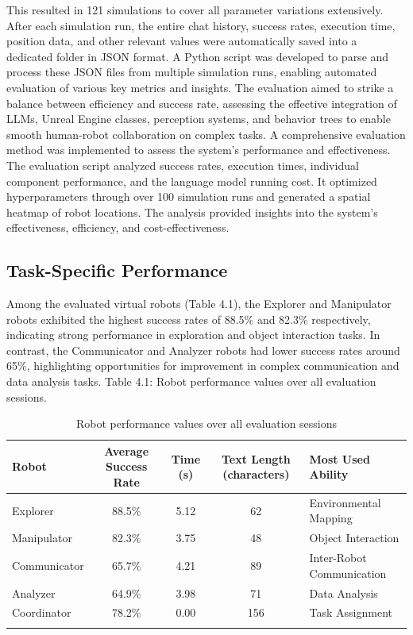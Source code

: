 \documentclass[pdflatex,sn-mathphys-num]{sn-jnl}%
\theoremstyle{thmstyleone}
\theoremstyle{thmstyletwo}%
\theoremstyle{thmstylethree}%
\begin{document}
This resulted in 121 simulations to cover all parameter variations extensively.
After each simulation run, the entire chat history, success rates, execution time, position data, and other relevant values were automatically saved into a dedicated folder in JSON format. A Python script was developed to parse and process these JSON files from multiple simulation runs, enabling automated evaluation of various key metrics and insights.
The evaluation aimed to strike a balance between efficiency and success rate, assessing the effective integration of LLMs, Unreal Engine classes, perception systems, and behavior trees to enable smooth human-robot collaboration on complex tasks. A comprehensive evaluation method was implemented to assess the system's performance and effectiveness.
The evaluation script analyzed success rates, execution times, individual component performance, and the language model running cost. It optimized hyperparameters through over 100 simulation runs and generated a spatial heatmap of robot locations. The analysis provided insights into the system's effectiveness, efficiency, and cost-effectiveness.
\subsection{Task-Specific Performance}
Among the evaluated virtual robots (Table 4.1), the Explorer and Manipulator robots exhibited the highest success rates of 88.5\% and 82.3\% respectively, indicating strong performance in exploration and object interaction tasks. In contrast, the Communicator and Analyzer robots had lower success rates around 65\%, highlighting opportunities for improvement in complex communication and data analysis tasks.
Table 4.1: Robot performance values over all evaluation sessions.

\begin{table}[h]
\caption{Robot performance values over all evaluation sessions}\label{tab1}
\begin{tabular*}{\textwidth}{@{\extracolsep\fill}lcccl}
\toprule
Robot & Average Success Rate & Time (s) & Text Length (characters) & Most Used Ability \\
\midrule
Explorer & 88.5\% & 5.12 & 62 & Environmental Mapping \\
Manipulator & 82.3\% & 3.75 & 48 & Object Interaction \\
Communicator & 65.7\% & 4.21 & 89 & Inter-Robot Communication \\
Analyzer & 64.9\% & 3.98 & 71 & Data Analysis \\
Coordinator & 78.2\% & 0.00 & 156 & Task Assignment \\
\botrule
\end{tabular*}
\end{table}
\end{document}
